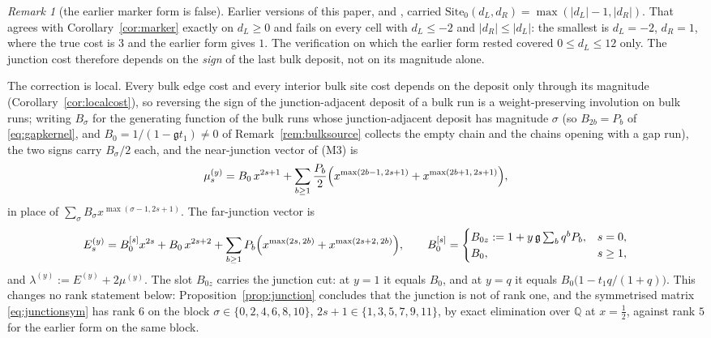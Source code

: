 \documentclass[11pt]{article}
\theoremstyle{plain}
\theoremstyle{definition}
\theoremstyle{remark}
\newtheorem{remark}[theorem]{Remark}
\newcommand{\Q}{\mathbb{Q}}
\begin{document}
\begin{remark}[the earlier marker form is false]\label{rem:markerfalse}
Earlier versions of this paper, and \cite{supplement}, carried
$\mathrm{Site}_0(d_L,d_R)=\max(|d_L|-1,|d_R|)$. That agrees with
Corollary~\ref{cor:marker} exactly on $d_L\ge0$ and fails on every cell with $d_L\le-2$ and
$|d_R|\le|d_L|$: the smallest is $d_L=-2$, $d_R=1$, where the true cost is $3$ and the earlier form
gives $1$. The verification on which the earlier form rested covered $0\le d_L\le12$ only. The
junction cost therefore depends on the \emph{sign} of the last bulk deposit, not on its magnitude
alone.

The correction is local. Every bulk edge cost and every interior bulk site cost depends on the
deposit only through its magnitude (Corollary~\ref{cor:localcost}), so reversing the sign of the
junction-adjacent deposit of a bulk run is a weight-preserving involution on bulk runs; writing
$B_\sigma$ for the generating function of the bulk runs whose junction-adjacent deposit has
magnitude $\sigma$ \textup{(}so $B_{2b}=P_b$ of \eqref{eq:gapkernel}, and
$B_0=1/(1-\mathfrak gt_1)\ne0$ of Remark~\ref{rem:bulksource} collects the empty chain and the chains
opening with a gap run\textup{)}, the two signs carry $B_\sigma/2$ each, and the near-junction vector
of \textup{(M3)} is
\begin{equation}\label{eq:junctionsym}
   \mu^{(y)}_s=B_0\,x^{2s+1}+\sum_{b\ge1}\frac{P_b}{2}
   \Bigl(x^{\max(2b-1,\,2s+1)}+x^{\max(2b+1,\,2s+1)}\Bigr),
\end{equation}
in place of $\sum_\sigma B_\sigma x^{\max(\sigma-1,2s+1)}$. The far-junction vector is
\begin{equation}\label{eq:farjunction}
   E^{(y)}_s=B_0^{[s]}x^{2s}+B_0\,x^{2s+2}+\sum_{b\ge1}P_b
   \Bigl(x^{\max(2s,\,2b)}+x^{\max(2s+2,\,2b)}\Bigr),\qquad
   B_0^{[s]}=\begin{cases}B_{0z}:=1+y\,\mathfrak g\sum_bq^bP_b,&s=0,\\ B_0,&s\ge1,\end{cases}
\end{equation}
and $\lambda^{(y)}:=E^{(y)}+2\mu^{(y)}$. The slot $B_{0z}$ carries the junction cut: at $y=1$ it
equals $B_0$, and at $y=q$ it equals $B_0\bigl(1-t_1q/(1+q)\bigr)$. This changes no rank statement below:
Proposition~\ref{prop:junction} concludes that the junction is not of rank one, and the symmetrised
matrix \eqref{eq:junctionsym} has rank $6$ on the block $\sigma\in\{0,2,4,6,8,10\}$,
$2s+1\in\{1,3,5,7,9,11\}$, by exact elimination over $\Q$ at $x=\tfrac12$, against rank $5$ for the
earlier form on the same block.
\end{remark}
\end{document}
